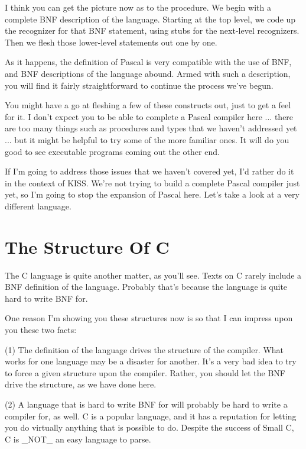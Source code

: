 \documentclass[float=false, crop=false]{standalone}
\begin{document}
I think you can get the picture now as to the procedure. We begin with a
complete BNF description of the language. Starting at the top level, we code up
the recognizer for that BNF statement, using stubs for the next-level
recognizers. Then we flesh those lower-level statements out one by one.

As it happens, the definition of Pascal is very compatible with the use of BNF,
and BNF descriptions of the language abound. Armed with such a description, you
will find it fairly straightforward to continue the process we've begun.

You might have a go at fleshing a few of these constructs out, just to get a
feel for it. I don't expect you to be able to complete a Pascal compiler here
... there are too many things such as procedures and types that we haven't
addressed yet ... but it might be helpful to try some of the more familiar ones.
It will do you good to see executable programs coming out the other end.

If I'm going to address those issues that we haven't covered yet, I'd rather do
it in the context of KISS. We're not trying to build a complete Pascal compiler
just yet, so I'm going to stop the expansion of Pascal here. Let's take a look
at a very different language.


\section{The Structure Of C}

The C language is quite another matter, as you'll see. Texts on C rarely include
a BNF definition of the language. Probably that's because the language is quite
hard to write BNF for.

One reason I'm showing you these structures now is so that I can impress upon
you these two facts:

 (1) The definition of  the  language drives the structure of the
     compiler.  What works for one language may be a disaster for
     another.    It's  a very bad idea to try to  force  a  given
     structure upon the compiler.  Rather, you should let the BNF
     drive the structure, as we have done here.

 (2) A language that is hard to write BNF for  will  probably  be
     hard  to  write  a compiler for, as well.  C  is  a  popular
     language,  and  it  has  a  reputation  for  letting you  do
     virtually  anything that is possible to  do.    Despite  the
     success of Small C, C is _NOT_ an easy language to parse.
\end{document}

